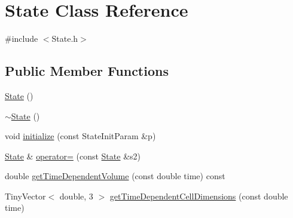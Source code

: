 \hypertarget{class_state}{\section{\-State \-Class \-Reference}
\label{class_state}
}


{\ttfamily \#include $<$\-State.\-h$>$}

\subsection*{\-Public \-Member \-Functions}
\begin{DoxyCompactItemize}
\item 
\hyperlink{class_state_ab91bb1dd5aa6260ab2a456581daf9ec2}{\-State} ()
\item 
\hyperlink{class_state_afab438d92b90dc18d194dbd9c9c8bab3}{$\sim$\-State} ()
\item 
void \hyperlink{class_state_a1871bc0d9a775f3cb322293bd375708d}{initialize} (const \-State\-Init\-Param \&p)
\item 
\hyperlink{class_state}{\-State} \& \hyperlink{class_state_a5c60ecb4c9602877fb2336d931bd2220}{operator=} (const \hyperlink{class_state}{\-State} \&s2)
\item 
double \hyperlink{class_state_a1c4adb7d612f35c6bf289be5b90617ac}{get\-Time\-Dependent\-Volume} (const double time) const 
\item 
\-Tiny\-Vector$<$ double, 3 $>$ \hyperlink{class_state_a291e9c5c798ccb597a4bf17b187795e7}{get\-Time\-Dependent\-Cell\-Dimensions} (const double time)
\end{DoxyCompactItemize}
